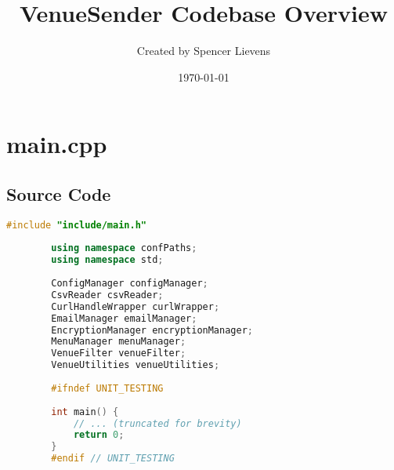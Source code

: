 \documentclass{article}
\title{VenueSender Codebase Overview}
\author{Created by Spencer Lievens}
\date{\today}
\begin{document}
	
	\maketitle
	\tableofcontents
	\newpage
	
	\section{main.cpp}
	
	\subsection*{Source Code}
\begin{mdframed}[backgroundcolor=background, hidealllines=false, innerleftmargin=15pt, innerrightmargin=5pt, innertopmargin=5pt, innerbottommargin=5pt]
	\begin{lstlisting}[language=C++]
		#include "include/main.h"
		
		using namespace confPaths;
		using namespace std;
		
		ConfigManager configManager;
		CsvReader csvReader;
		CurlHandleWrapper curlWrapper;
		EmailManager emailManager;
		EncryptionManager encryptionManager;
		MenuManager menuManager;
		VenueFilter venueFilter;
		VenueUtilities venueUtilities;
		
		#ifndef UNIT_TESTING
		
		int main() {
			// ... (truncated for brevity)
			return 0;
		}
		#endif // UNIT_TESTING
	\end{lstlisting}
\end{mdframed}
	
\end{document}
